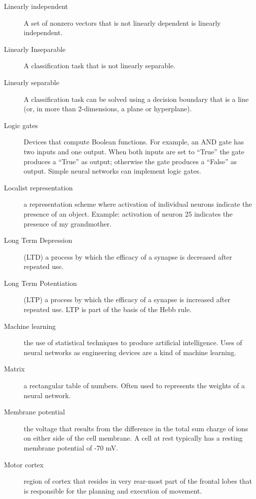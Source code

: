\begin{description}
\item[Linearly independent] A set of nonzero vectors that is not linearly
dependent is linearly independent.

\item[Linearly Inseparable] A classification task that is not linearly separable.

\item[Linearly separable] A classification task can be solved using a decision boundary that is a line (or, in more than 2-dimensions, a plane or hyperplane).

\item[Logic gates] Devices that compute Boolean functions. For example, an AND gate has two inputs and one output. When both inputs are set to ``True'' the gate produces a ``True'' as output; otherwise the gate produces a ``False'' as output. Simple neural networks can implement logic gates.

\item[Localist representation] a representation scheme where activation of individual neurons indicate the presence of an object. Example: activation of neuron 25 indicates the presence of my grandmother.

\item[Long Term Depression] (LTD) a  process by which the efficacy of a synapse is decreased after repeated use.

\item[Long Term Potentiation] (LTP) a process by which the efficacy of a synapse is increased after repeated use. LTP is part of the basis of the Hebb rule.

\item[Machine learning] the use of statistical techniques to produce artificial intelligence. Uses of neural networks as engineering devices are a kind of machine learning.

\item[Matrix] a rectangular table of numbers. Often used to represents the 
weights of a neural network.

\item[Membrane potential] the voltage that results from the difference in the total sum charge of ions on either side of the cell membrane. A cell at rest typically has a resting membrane potential of -70 mV. 


\item[Motor cortex] region of cortex that resides in very rear-most part of the frontal lobes that is responsible for the planning and execution of movement. 


\end{description}

